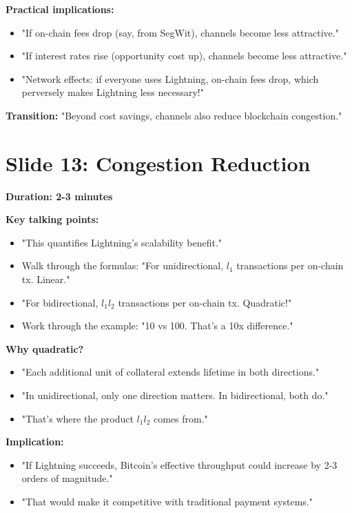 \documentclass[11pt]{article}
\begin{document}
\textbf{Practical implications:}
\begin{itemize}
    \item "If on-chain fees drop (say, from SegWit), channels become less attractive."
    \item "If interest rates rise (opportunity cost up), channels become less attractive."
    \item "Network effects: if everyone uses Lightning, on-chain fees drop, which perversely makes Lightning less necessary!"
\end{itemize}

\textbf{Transition:} "Beyond cost savings, channels also reduce blockchain congestion."

\section*{Slide 13: Congestion Reduction}

\textbf{Duration: 2-3 minutes}

\textbf{Key talking points:}
\begin{itemize}
    \item "This quantifies Lightning's scalability benefit."
    \item Walk through the formulas: "For unidirectional, $l_1$ transactions per on-chain tx. Linear."
    \item "For bidirectional, $l_1 l_2$ transactions per on-chain tx. Quadratic!"
    \item Work through the example: "10 vs 100. That's a 10x difference."
\end{itemize}

\textbf{Why quadratic?}
\begin{itemize}
    \item "Each additional unit of collateral extends lifetime in both directions."
    \item "In unidirectional, only one direction matters. In bidirectional, both do."
    \item "That's where the product $l_1 l_2$ comes from."
\end{itemize}

\textbf{Implication:}
\begin{itemize}
    \item "If Lightning succeeds, Bitcoin's effective throughput could increase by 2-3 orders of magnitude."
    \item "That would make it competitive with traditional payment systems."
\end{itemize}
\end{document}
